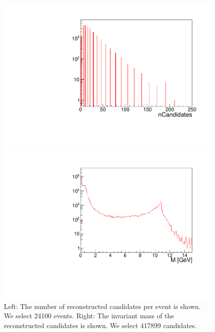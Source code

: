 \documentclass[a4paper,11pt,twosided,final,german,openbib,pdftex,listof=totoc,bibliography=totoc]{scrbook}
\begin{document}
\begin{figure}[h!]
	\centering
	\begin{minipage}[b]{0.45\linewidth}
		\centering
		\includegraphics[width=\textwidth]{Cuts/nCandAll.pdf}
	\end{minipage}
	\hspace{0.5cm}
	\begin{minipage}[b]{0.45\linewidth}
		\centering
		\includegraphics[width=\textwidth]{Cuts/Mall.pdf}
	\end{minipage}
	\caption[Number Of Candidates And Invariant Mass (No Cuts)]{Left: The number of reconstructed candidates per event is shown. We select 24100 events.
		Right: The invariant mass of the reconstructed candidates is shown. We select 417899 candidates.}
	\label{fig:nCandAll}
\end{figure}
\end{document}
